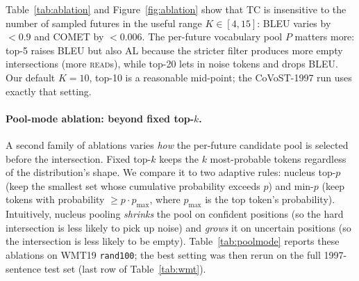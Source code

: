 \documentclass{article}
\begin{document}
Table~\ref{tab:ablation} and Figure~\ref{fig:ablation} show that TC is insensitive to the
number of sampled futures in the useful range $K\in[4,15]$: BLEU varies by $<0.9$ and COMET by
$<0.006$. The per-future vocabulary pool $P$ matters more: top-5 raises BLEU but also AL
because the stricter filter produces more empty intersections (more \textsc{read}s), while
top-20 lets in noise tokens and drops BLEU. Our default $K{=}10$, top-10 is a reasonable
mid-point; the CoVoST-1997 run uses exactly that setting.

\paragraph{Pool-mode ablation: beyond fixed top-$k$.}
A second family of ablations varies \emph{how} the per-future candidate pool is selected before
the intersection. Fixed top-$k$ keeps the $k$ most-probable tokens regardless of the
distribution's shape. We compare it to two adaptive rules: nucleus top-$p$
(keep the smallest set whose cumulative probability exceeds $p$) and min-$p$ (keep tokens with
probability $\geq p\cdot p_{\max}$, where $p_{\max}$ is the top token's probability). Intuitively,
nucleus pooling \emph{shrinks} the pool on confident positions (so the hard intersection is less
likely to pick up noise) and \emph{grows} it on uncertain positions (so the intersection is less
likely to be empty). Table~\ref{tab:poolmode} reports these ablations on WMT19 \texttt{rand100};
the best setting was then rerun on the full 1997-sentence test set (last row of
Table~\ref{tab:wmt}).
\end{document}
